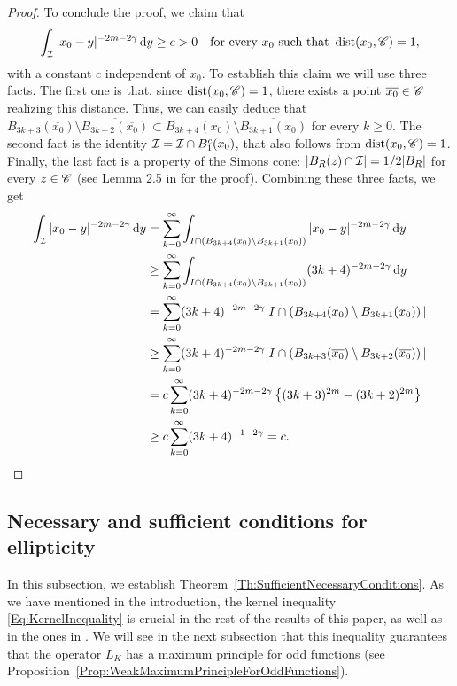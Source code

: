 \begin{proof}
	To conclude the proof, we claim that
	$$ \int_{\mathcal{I}} |x_0-y|^{-2m-2\gamma} \,\mathrm{d} y \geq c>0\quad \textrm{for every } x_0 \textrm{ such that } \operatorname{dist}(x_0,\mathscr{C}) = 1,$$
	with a constant $c$ independent of $x_0$. To establish this claim we will use three facts. The first one is that, since $\operatorname{dist}(x_0,\mathscr{C}) = 1$, there exists a point $\overline{x_0}\in \mathscr{C}$ realizing this distance. Thus, we can easily deduce that $B_{3k+3}(\overline{x_0}) \setminus \overline{ B_{3k+2}(\overline{x_0})} \subset  B_{3k+4}(x_0)\setminus \overline{ B_{3k+1}(x_0)}$ for every $k\geq 0$. The second fact is the identity $\mathcal{I} = \mathcal{I} \cap B_1^c(x_0)$, that also follows from $\operatorname{dist}(x_0,\mathscr{C}) = 1$. Finally, the last fact is a property of the Simons cone: $|B_R(z) \cap \mathcal{I}| = 1/2 |B_R|$ for every $z\in \mathscr{C}$ (see Lemma 2.5 in \cite{Felipe-Sanz-Perela:SaddleFractional} for the proof). Combining these three facts, we get
	\begin{align*}
	\int_{\mathcal{I}} |x_0-y|^{-2m-2\gamma} \,\mathrm{d} y &= \sum_{k=0}^\infty \int_{I\cap \left( B_{3k+4}(x_0)\setminus B_{3k+1}(x_0)\right)} |x_0-y|^{-2m-2\gamma} \,\mathrm{d} y\\
	&\geq \sum_{k=0}^\infty \int_{I\cap \left( B_{3k+4}(x_0)\setminus B_{3k+1}(x_0)\right)} (3k+4)^{-2m-2\gamma} \,\mathrm{d} y \\
	&= \sum_{k=0}^\infty (3k+4)^{-2m-2\gamma} |I\cap \left( B_{3k+4}(x_0)\setminus B_{3k+1}(x_0)\right)|\\
	&\geq \sum_{k=0}^\infty (3k+4)^{-2m-2\gamma} |I\cap \left( B_{3k+3}(\overline{x_0}) \setminus B_{3k+2}(\overline{x_0}) \right)|\\
	&= c \sum_{k=0}^\infty (3k+4)^{-2m-2\gamma} \left\{(3k+3)^{2m} -(3k+2)^{2m}\right\}\\
	&\geq c \sum_{k=0}^\infty (3k+4)^{-1-2\gamma} = c.
	\end{align*}
\end{proof}


\subsection{Necessary and sufficient conditions for ellipticity}




In this subsection, we establish Theorem~\ref{Th:SufficientNecessaryConditions}. As we have mentioned in the introduction, the kernel inequality \eqref{Eq:KernelInequality} is crucial in the rest of the results of this paper, as well as in the ones in \cite{FelipeSanz-Perela:IntegroDifferentialII}. We will see in the next subsection that this inequality guarantees that the operator $L_K$ has a maximum principle for odd functions (see Proposition~\ref{Prop:WeakMaximumPrincipleForOddFunctions}).

